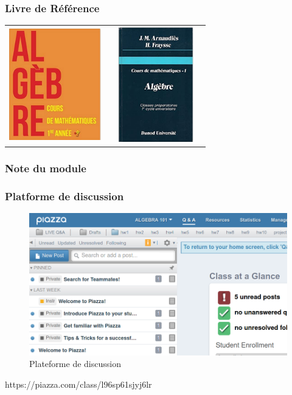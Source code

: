 \documentclass{beamer}
\begin{document}
\begin{frame}[t]
  \frametitle{Livre de Référence}
  \vspace*{1cm}
  \centering
  \begin{tabular}{cc}
    \includegraphics[width=4cm, height=5cm]{./book1.png} &
    \includegraphics[width=4cm, height=5cm]{./book2.png}  
  \end{tabular}
\end{frame}
\begin{frame}[t]
  \frametitle{Note du module}
  \begin{figure}[htpb]
    \centering
  \end{figure} 
\end{frame}

\begin{frame}[t]
  \frametitle{Platforme de discussion}
  \begin{figure}[htpb]
    \centering
    \includegraphics[width=0.8\linewidth]{./piazza.png}
    \caption{Plateforme de discussion}%
    \label{fig:./piazza}
  \end{figure} 
    \centering
    \Large
    \alert{https://piazza.com/class/l96sp61sjyj6lr}
\end{frame}
\end{document}
